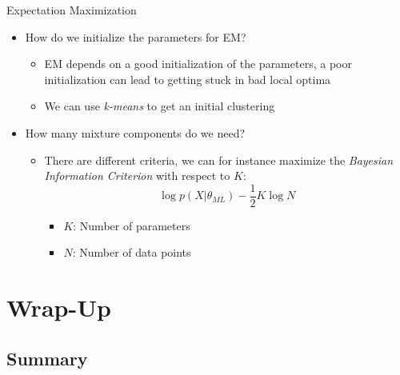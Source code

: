\begin{frame}{Expectation Maximization}{}
	\begin{itemize}
		\item How do we initialize the parameters for EM?
		\begin{itemize}
			\item EM depends on a good initialization of the parameters, a poor initialization can lead to getting stuck in bad local optima
			\item We can use \textit{k-means} to get an initial clustering
		\end{itemize}
		\item How many mixture components do we need?
		\begin{itemize}
			\item There are different criteria, we can for instance maximize the \textit{Bayesian Information Criterion} with respect to $K$:
			\begin{equation}
				\log p(X|\theta_{ML}) - \frac{1}{2} K \log N
			\end{equation}
			\begin{itemize}
				\item $K$: Number of parameters
				\item $N$: Number of data points
			\end{itemize}
		\end{itemize}
	\end{itemize}
\end{frame}



\section{Wrap-Up}

\subsection{Summary}

